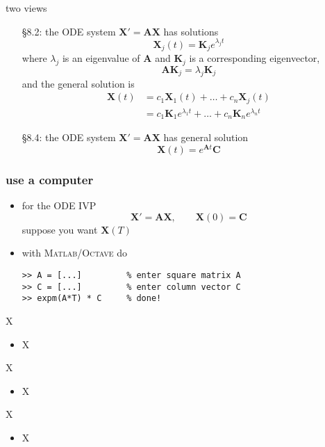 \documentclass[urlcolor=blue,dvipsnames]{beamer}
\newcommand{\bA}{\mathbf{A}}
\newcommand{\bC}{\mathbf{C}}
\newcommand{\bK}{\mathbf{K}}
\newcommand{\bX}{\mathbf{X}}
\newcommand{\Matlab}{\textsc{Matlab}\xspace}
\newcommand{\Octave}{\textsc{Octave}\xspace}
\begin{document}
\begin{frame}{two views}

\begin{itemize}
\item[\S 8.2:] the ODE system $\bX' = \bA \bX$ has solutions
    $$\bX_j(t) = \bK_j e^{\lambda_j t}$$
where $\lambda_j$ is an eigenvalue of $\bA$ and $\bK_j$ is a corresponding eigenvector,
    $$\bA\bK_j=\lambda_j \bK_j$$
and the general solution is
\begin{align*}
\bX(t) &= c_1 \bX_1(t) + \dots + c_n \bX_j(t) \\
       &= c_1 \bK_1 e^{\lambda_1 t} + \dots + c_n \bK_n e^{\lambda_n t}
\end{align*}
\item[\S 8.4:] the ODE system $\bX' = \bA \bX$ has general solution
    $$\bX(t) = e^{\bA t}\bC$$
\end{itemize}
\end{frame}



\begin{frame}[fragile]
\frametitle{use a computer}

\begin{itemize}
\item for the ODE IVP
$$\bX' = \bA \bX, \qquad \bX(0)=\bC$$
suppose you want $\bX(T)$

\medskip
\item with \Matlab/\Octave do
\begin{Verbatim}[fontsize=\small]
>> A = [...]         % enter square matrix A
>> C = [...]         % enter column vector C
>> expm(A*T) * C     % done!
\end{Verbatim}
\end{itemize}
\end{frame}


\begin{frame}{X}

\begin{itemize}
\item X
\end{itemize}
\end{frame}


\begin{frame}{X}

\begin{itemize}
\item X
\end{itemize}
\end{frame}


\begin{frame}{X}

\begin{itemize}
\item X
\end{itemize}
\end{frame}
\end{document}
